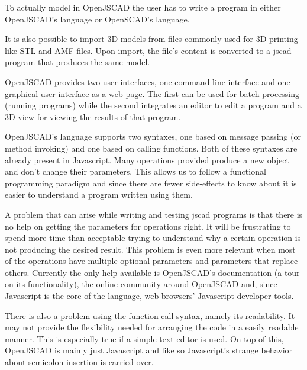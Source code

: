 \documentclass{./llncs2e/llncs}
\begin{document}
	To actually model in OpenJSCAD the user has to write a program in either OpenJSCAD's language or OpenSCAD's language.

	It is also possible to import 3D models from files commonly used for 3D printing like STL and AMF files.
	Upon import, the file's content is converted to a jscad program that produces the same model. 

	OpenJSCAD provides two user interfaces, one command-line interface and one graphical user interface as a web page.
	The first can be used for batch processing (running programs) while the second integrates an editor to edit a program and a 3D view for viewing the results of that program.

	OpenJSCAD's language supports two syntaxes, one based on message passing (or method invoking) and one based on calling functions.
	Both of these syntaxes are already present in Javascript. 
	Many operations provided produce a new object and don't change their parameters. 
	This allows us to follow a functional programming paradigm and since there are fewer side-effects to know about it is easier to understand a program written using them.

	A problem that can arise while writing and testing jscad programs is that there is no help on getting the parameters for operations right.
	It will be frustrating to spend more time than acceptable trying to understand why a certain operation is not producing the desired result. 
	This problem is even more relevant when most of the operations have multiple optional parameters and parameters that replace others. 
	Currently the only help available is OpenJSCAD's documentation (a tour on its functionality), the online community around OpenJSCAD and, since Javascript is the core of the language, web browsers' Javascript developer tools.

	There is also a problem using the function call syntax, namely its readability.
	It may not provide the flexibility needed for arranging the code in a easily readable manner. 
	This is especially true if a simple text editor is used. 
	On top of this, OpenJSCAD is mainly just Javascript and like so Javascript's strange behavior about semicolon insertion is carried over. 

\end{document}

